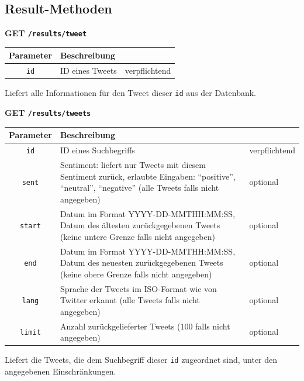 \subsection*{Result-Methoden}
\noindent
\textbf{GET \texttt{/results/tweet}}
\begin{table}[h!]
\begin{tabular}{| c | p{\tweite} | l |}
\hline
	\textbf{Parameter} & \textbf{Beschreibung} &  \\
\hline \hline
 	\texttt{id} & ID eines Tweets & verpflichtend \\
\hline
\end{tabular}
\end{table}
\newline
Liefert alle Informationen für den Tweet dieser \texttt{id} aus der Datenbank.

\noindent
\textbf{GET \texttt{/results/tweets}}
\begin{table}[h!]
\begin{tabular}{| c | p{10.1cm} | l |}
\hline
	\textbf{Parameter} & \textbf{Beschreibung} &  \\
\hline \hline
 	\texttt{id} & ID eines Suchbegriffs & verpflichtend \\
\hline
 	\texttt{sent} & Sentiment: liefert nur Tweets mit diesem Sentiment zurück, erlaubte Eingaben: "`positive"', "`neutral"', "`negative"' (alle Tweets falls nicht angegeben) & optional \\
\hline
 	\texttt{start} & Datum im Format YYYY-DD-MMTHH:MM:SS, Datum des ältesten zurückgegebenen Tweets (keine untere Grenze falls nicht angegeben) & optional \\
\hline
 	\texttt{end} & Datum im Format YYYY-DD-MMTHH:MM:SS, Datum des neuesten zurückgegebenen Tweets (keine obere Grenze falls nicht angegeben) & optional \\
\hline
 	\texttt{lang} & Sprache der Tweets im ISO-Format wie von Twitter erkannt (alle Tweets falls nicht angegeben) &  optional\\
\hline
 	\texttt{limit} & Anzahl zurückgelieferter Tweets (100 falls nicht angegeben) & optional \\
\hline
\end{tabular}
\end{table}
\newline
Liefert die Tweets, die dem Suchbegriff dieser \texttt{id} zugeordnet sind, unter den angegebenen Einschränkungen.

